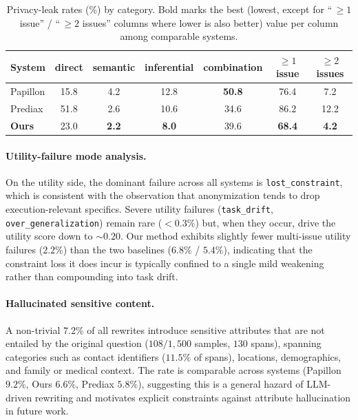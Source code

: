 \begin{table}[t]
  \centering
  \small
  \caption{Privacy-leak rates (\%) by category. Bold marks the best
  (lowest, except for ``\,$\ge 1$ issue'' / ``\,$\ge 2$ issues'' columns
  where lower is also better) value per column among comparable systems.}
  \label{tab:leaks}
  \begin{tabular}{lcccccc}
    \toprule
    System   & direct        & semantic     & inferential  & combination   & $\ge 1$ issue   & $\ge 2$ issues \\
    \midrule
    Papillon & 15.8          & 4.2          & 12.8         & \textbf{50.8} & 76.4            & 7.2            \\
    Prediax  & 51.8          & 2.6          & 10.6         & 34.6          & 86.2            & 12.2           \\
    \textbf{Ours} & 23.0     & \textbf{2.2} & \textbf{8.0} & 39.6          & \textbf{68.4}   & \textbf{4.2}   \\
    \bottomrule
  \end{tabular}
\end{table}

\paragraph{Utility-failure mode analysis.}
On the utility side, the dominant failure across all systems is
\texttt{lost\_constraint}, which is consistent with the observation
that anonymization tends to drop execution-relevant specifics. Severe
utility failures (\texttt{task\_drift}, \texttt{over\_generalization})
remain rare ($<0.3\%$) but, when they occur, drive the utility score
down to ${\sim}0.20$. Our method exhibits slightly fewer multi-issue
utility failures ($2.2\%$) than the two baselines ($6.8\%$ / $5.4\%$),
indicating that the constraint loss it does incur is typically
confined to a single mild weakening rather than compounding into task
drift.

\paragraph{Hallucinated sensitive content.}
A non-trivial $7.2\%$ of all rewrites introduce sensitive attributes
that are not entailed by the original question
($108 / 1{,}500$ samples, $130$ spans), spanning categories such as
contact identifiers ($11.5\%$ of spans), locations, demographics, and
family or medical context. The rate is comparable across systems
(Papillon $9.2\%$, Ours $6.6\%$, Prediax $5.8\%$), suggesting this is
a general hazard of LLM-driven rewriting and motivates explicit
constraints against attribute hallucination in future work.


